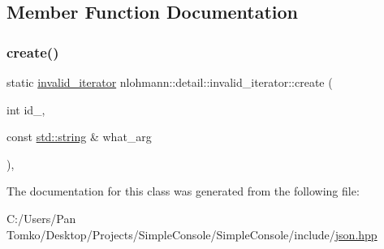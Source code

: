 \subsection{Member Function Documentation}
\mbox{\label{classnlohmann_1_1detail_1_1invalid__iterator_a4e849260a3caa1b288c7e619130c6c09}} 
\subsubsection{\texorpdfstring{create()}{create()}}
{\footnotesize\ttfamily static \mbox{\hyperlink{classnlohmann_1_1detail_1_1invalid__iterator}{invalid\+\_\+iterator}} nlohmann\+::detail\+::invalid\+\_\+iterator\+::create (\begin{DoxyParamCaption}\item[{int}]{id\+\_\+,  }\item[{const \mbox{\hyperlink{namespacenlohmann_1_1detail_a1ed8fc6239da25abcaf681d30ace4985ab45cffe084dd3d20d928bee85e7b0f21}{std\+::string}} \&}]{what\+\_\+arg }\end{DoxyParamCaption})\hspace{0.3cm}{\ttfamily [inline]}, {\ttfamily [static]}}



The documentation for this class was generated from the following file\+:\begin{DoxyCompactItemize}
\item 
C\+:/\+Users/\+Pan Tomko/\+Desktop/\+Projects/\+Simple\+Console/\+Simple\+Console/include/\mbox{\hyperlink{json_8hpp}{json.\+hpp}}\end{DoxyCompactItemize}
